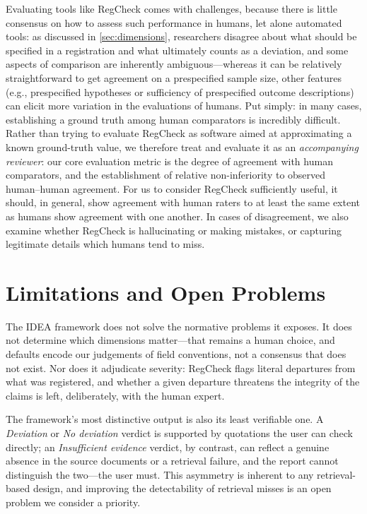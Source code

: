 \documentclass{article}
\begin{document}
Evaluating tools like RegCheck comes with challenges, because there is little
consensus on how to assess such performance in humans, let alone automated
tools: as discussed in \cref{sec:dimensions}, researchers disagree about what
should be specified in a registration and what ultimately counts as a deviation,
and some aspects of comparison are inherently ambiguous---whereas it can be
relatively straightforward to get agreement on a prespecified sample size, other
features (e.g., prespecified hypotheses or sufficiency of prespecified outcome
descriptions) can elicit more variation in the evaluations of humans. Put
simply: in many cases, establishing a ground truth among human comparators is
incredibly difficult. Rather than trying to evaluate RegCheck as software aimed
at approximating a known ground-truth value, we therefore treat and evaluate it
as an \emph{accompanying reviewer}: our core evaluation metric is the degree of
agreement with human comparators, and the establishment of relative
non-inferiority to observed human--human agreement. For us to consider RegCheck
sufficiently useful, it should, in general, show agreement with human raters to
at least the same extent as humans show agreement with one another. In cases of
disagreement, we also examine whether RegCheck is hallucinating or making
mistakes, or capturing legitimate details which humans tend to miss.

\section{Limitations and Open Problems}\label{sec:limitations}

The IDEA framework does not solve the normative problems it exposes. It does not
determine which dimensions matter---that remains a human choice, and defaults
encode our judgements of field conventions, not a consensus that does not
exist. Nor does it adjudicate severity: RegCheck flags literal departures from
what was registered, and whether a given departure threatens the integrity of
the claims is left, deliberately, with the human expert.

The framework's most distinctive output is also its least verifiable one. A
\emph{Deviation} or \emph{No deviation} verdict is supported by quotations the
user can check directly; an \emph{Insufficient evidence} verdict, by contrast,
can reflect a genuine absence in the source documents or a retrieval failure,
and the report cannot distinguish the two---the user must. This asymmetry is
inherent to any retrieval-based design, and improving the detectability of
retrieval misses is an open problem we consider a priority.
\end{document}
